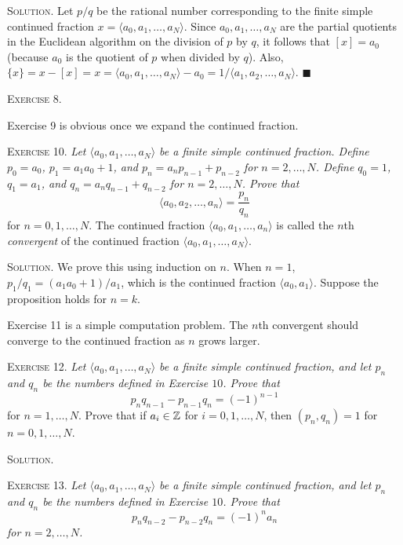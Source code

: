 \documentclass[11pt, leqno]{article}
\newcommand{\done}{\ensuremath{\blacksquare}}
\begin{document}
\textsc{Solution}. Let $p/q$ be the rational number corresponding to the finite simple continued fraction $x=\langle a_0, a_1,\ldots,a_N \rangle$. Since $a_0, a_1, \ldots, a_N$ are the partial quotients in the Euclidean algorithm on the division of $p$ by $q$, it follows that $[x] = a_0$ (because $a_0$ is the quotient of $p$ when divided by $q$). Also, $\{x\} = x - [x] = x=\langle a_0, a_1,\ldots,a_N \rangle - a_0 = 1/\langle a_1, a_2,\ldots,a_N \rangle$. \done

\textsc{Exercise 8}.

Exercise 9 is obvious once we expand the continued fraction.

\textsc{Exercise 10}. \emph{Let $\langle a_0, a_1,\ldots,a_N \rangle$ be a finite simple continued fraction. Define $p_0 = a_0$, $p_1 = a_1a_0+1$, and $p_n = a_np_{n-1} + p_{n-2}$ for $n=2,\ldots, N$. Define $q_0=1$, $q_1=a_1$, and $q_n = a_nq_{n-1} + q_{n-2}$ for $n=2,\ldots, N$. Prove that 
\begin{displaymath}
\langle a_0, a_2,\ldots,a_n \rangle = \frac{p_n}{q_n}
\end{displaymath}}for $n=0,1,\ldots, N$. The continued fraction $\langle a_0, a_1,\ldots,a_n \rangle $ is called the $n$th \emph{convergent} of the continued fraction $\langle a_0, a_1, \ldots, a_N\rangle$.

\textsc{Solution}. We prove this using induction on $n$. When $n=1$, $p_1/q_1 = (a_1a_0+1)/a_1$, which is the continued fraction $\langle a_0, a_1 \rangle$. Suppose the proposition holds for $n=k$.

Exercise 11 is a simple computation problem. The $n$th convergent should converge to the continued fraction as $n$ grows larger.

\textsc{Exercise 12}. \emph{Let $\langle a_0, a_1, \ldots, a_N\rangle$ be a finite simple continued fraction, and let $p_n$ and $q_n$ be the numbers defined in Exercise $10$. Prove that 
\begin{displaymath}
p_nq_{n-1} - p_{n-1}q_n = (-1)^{n-1}
\end{displaymath}}for $n=1,\ldots, N$. Prove that if $a_i \in \mathbb{Z}$ for $i=0,1,\ldots, N$, then $(p_n, q_n) = 1$ for $n=0,1,\ldots, N$.

\textsc{Solution}. 

\textsc{Exercise 13}. \emph{Let $\langle a_0, a_1, \ldots, a_N\rangle$ be a finite simple continued fraction, and let $p_n$ and $q_n$ be the numbers defined in Exercise $10$. Prove that 
\begin{displaymath}
p_nq_{n-2} - p_{n-2}q_n = (-1)^n a_n
\end{displaymath}for $n=2,\ldots, N$.}
\end{document}
